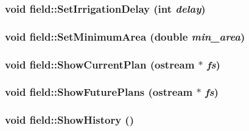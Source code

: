 \label{classfield_a72edee119271bbed91109a3c648c61c6}
\hypertarget{classfield_a5997f5906b29b4f9ebf81965c239d1b2}{
\subsubsection[{SetIrrigationDelay}]{\setlength{\rightskip}{0pt plus 5cm}void field::SetIrrigationDelay (int {\em delay})}}
\label{classfield_a5997f5906b29b4f9ebf81965c239d1b2}
\hypertarget{classfield_a94bf6bbab5235c10e3f495fbd4120cda}{
\subsubsection[{SetMinimumArea}]{\setlength{\rightskip}{0pt plus 5cm}void field::SetMinimumArea (double {\em min\_\-area})}}
\label{classfield_a94bf6bbab5235c10e3f495fbd4120cda}
\hypertarget{classfield_afa0f5c8b78d3aa7ca1f1788ee957df52}{
\subsubsection[{ShowCurrentPlan}]{\setlength{\rightskip}{0pt plus 5cm}void field::ShowCurrentPlan (ostream $\ast$ {\em fs})}}
\label{classfield_afa0f5c8b78d3aa7ca1f1788ee957df52}
\hypertarget{classfield_ad6338ef1402d2bfa7837678ab9f79f41}{
\subsubsection[{ShowFuturePlans}]{\setlength{\rightskip}{0pt plus 5cm}void field::ShowFuturePlans (ostream $\ast$ {\em fs})}}
\label{classfield_ad6338ef1402d2bfa7837678ab9f79f41}
\hypertarget{classfield_aa0a885f9ccaccf1004a295f48a767992}{
\subsubsection[{ShowHistory}]{\setlength{\rightskip}{0pt plus 5cm}void field::ShowHistory ()}}
